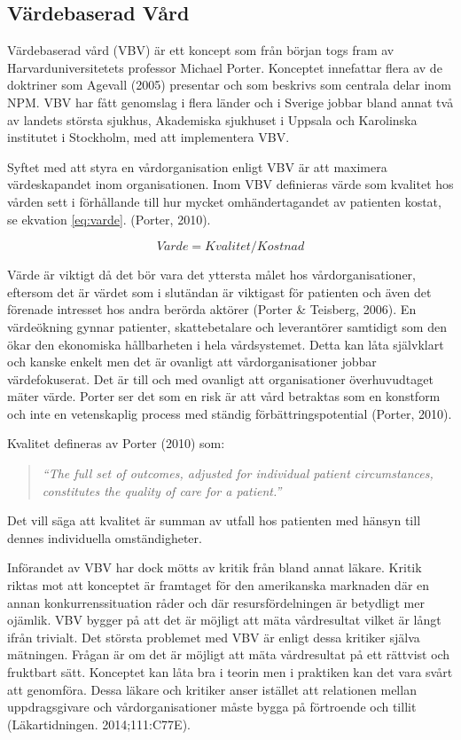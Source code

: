 \subsection{Värdebaserad Vård}

Värdebaserad vård (VBV) är ett koncept som från början togs fram av Harvarduniversitetets professor Michael Porter. Konceptet innefattar flera av de doktriner som Agevall (2005) presentar och som beskrivs som centrala delar inom NPM. VBV har fått genomslag i flera länder och i Sverige jobbar bland annat två av landets största sjukhus, Akademiska sjukhuset i Uppsala och Karolinska institutet i Stockholm, med att implementera VBV.
 
Syftet med att styra en vårdorganisation enligt VBV är att maximera värdeskapandet inom organisationen. Inom VBV definieras värde som kvalitet hos vården sett i förhållande till hur mycket omhändertagandet av patienten kostat, se ekvation \ref{eq:varde}. (Porter, 2010).

\begin{equation}
\label{eq:varde}
	V \ddot{a} rde = Kvalitet/Kostnad
\end{equation}

Värde är viktigt då det bör vara det yttersta målet hos vårdorganisationer, eftersom det är värdet som i slutändan är viktigast för patienten och även det förenade intresset hos andra berörda aktörer (Porter \& Teisberg, 2006). En värdeökning gynnar patienter, skattebetalare och leverantörer samtidigt som den ökar den ekonomiska hållbarheten i hela vårdsystemet. Detta kan låta självklart och kanske enkelt men det är ovanligt att vårdorganisationer jobbar värdefokuserat. Det är till och med ovanligt att organisationer överhuvudtaget mäter värde. Porter ser det som en risk är att vård betraktas som en konstform och inte en vetenskaplig process med ständig förbättringspotential (Porter, 2010).
 
Kvalitet defineras av Porter (2010) som:
\begin{quotation}
\textit{``The full set of outcomes, adjusted for individual patient circumstances, constitutes the quality of care for a patient.''}
\end{quotation}
Det vill säga att kvalitet är summan av utfall hos patienten med hänsyn till dennes individuella omständigheter.

Införandet av VBV har dock mötts av kritik från bland annat läkare. Kritik
riktas mot att konceptet är framtaget för den amerikanska marknaden där en annan
konkurrenssituation råder och där resursfördelningen är betydligt mer ojämlik. VBV bygger på att det är möjligt att mäta vårdresultat vilket är långt ifrån trivialt. Det största problemet med VBV är enligt dessa kritiker själva mätningen. Frågan är om det är möjligt att mäta vårdresultat på ett rättvist och fruktbart sätt. Konceptet kan låta bra i teorin men i praktiken kan det vara svårt att genomföra. Dessa läkare och kritiker anser istället att relationen mellan uppdragsgivare och vårdorganisationer måste bygga på förtroende och tillit (Läkartidningen. 2014;111:C77E).


